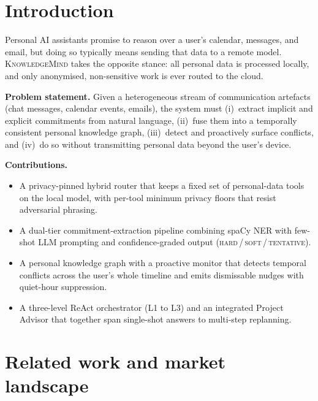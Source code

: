 \documentclass{ecai}
\newcommand{\km}{\textsc{KnowledgeMind}}
\begin{document}

\section{Introduction}

Personal AI assistants promise to reason over a user's calendar, messages, and
email, but doing so typically means sending that data to a remote model. \km{}
takes the opposite stance: all personal data is processed locally, and only
anonymised, non-sensitive work is ever routed to the cloud.

\noindent\textbf{Problem statement.} Given a heterogeneous stream of
communication artefacts (chat messages, calendar events, emails), the system
must (i)~extract implicit and explicit commitments from natural language,
(ii)~fuse them into a temporally consistent personal knowledge graph,
(iii)~detect and proactively surface conflicts, and (iv)~do so without
transmitting personal data beyond the user's device.

\noindent\textbf{Contributions.}
\begin{itemize}[noitemsep]
  \item A privacy-pinned hybrid router that keeps a fixed set of personal-data
        tools on the local model, with per-tool minimum privacy floors that
        resist adversarial phrasing.
  \item A dual-tier commitment-extraction pipeline combining spaCy NER with
        few-shot LLM prompting and confidence-graded output
        (\textsc{hard}\,/\,\textsc{soft}\,/\,\textsc{tentative}).
  \item A personal knowledge graph with a proactive monitor that detects temporal
        conflicts across the user's whole timeline and emits dismissable nudges
        with quiet-hour suppression.
  \item A three-level ReAct orchestrator (L1 to L3) and an integrated Project
        Advisor that together span single-shot answers to multi-step replanning.
\end{itemize}


\section{Related work and market landscape}\label{sec:related}
\end{document}
